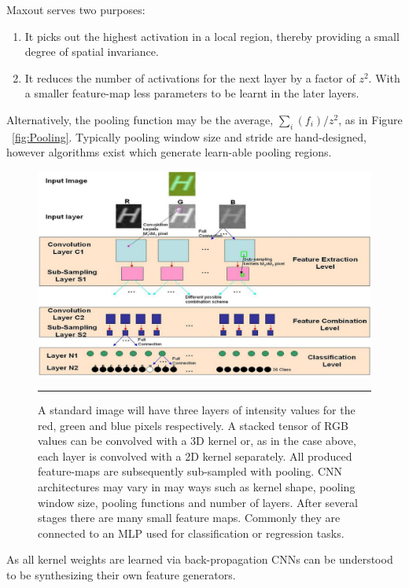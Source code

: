 Maxout serves two purposes:
\begin{enumerate}
\item It picks out the highest activation in a local region, thereby providing a small degree of spatial invariance.
\item It reduces the number of activations for the next layer by a factor of $z^2$.
With a smaller feature-map less parameters to be learnt in the later layers.
\end{enumerate}

Alternatively, the pooling function may be the average, $\sum_i(f_i)/z^2$, as in Figure ~\ref{fig:Pooling}.
Typically pooling window size and stride are hand-designed, however algorithms exist which generate learn-able pooling regions\citep{bengio2009advances}\citep{lecun2015deep}.
\begin{figure}[htbp]
	\centering
		\includegraphics[width = 1.0\textwidth]{./Figures/CNN_network_sparse_coral_classification_3.jpg} %
		\rule{35em}{0.5pt}
	\caption[CNN Architecture]{A standard image will have three layers of intensity values for the red, green and blue pixels respectively. A stacked tensor of RGB values can be convolved with a 3D kernel or, as in the case above, each layer is convolved with a 2D kernel separately. All produced feature-maps are subsequently sub-sampled with pooling. CNN architectures may vary in may ways such as kernel shape, pooling window size, pooling functions and number of layers. After several stages there are many small feature maps. Commonly they are connected to an MLP used for classification or regression tasks.}
	\label{fig:CNN}
\end{figure}

As all kernel weights are learned via back-propagation CNNs can be understood to be synthesizing their own feature generators\citep{lecun1995convolutional}.

